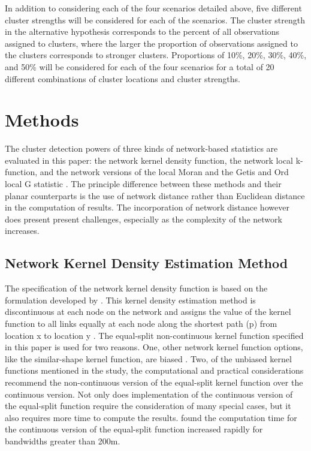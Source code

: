 \documentclass[12pt, letterpaper]{article}
\begin{document}
In addition to considering each of the four scenarios detailed above, five different cluster strengths will be considered for each of the scenarios. The cluster strength in the alternative hypothesis corresponds to the percent of all observations assigned to clusters, where the larger the proportion of observations assigned to the clusters corresponds to stronger clusters. Proportions of 10\%, 20\%, 30\%, 40\%, and 50\% will be considered for each of the four scenarios for a total of 20 different combinations of cluster locations and cluster strengths.

\section{Methods}
The cluster detection powers of three kinds of network-based statistics are evaluated in this paper: the network kernel density function, the network local k-function, and the network versions of the local Moran \citep{anselin1995local} and the Getis and Ord local G statistic \citep{getisord1992distance}. The principle difference between these methods and their planar counterparts is the use of network distance rather than Euclidean distance in the computation of results. The incorporation of network distance however does present present challenges, especially as the complexity of the network increases. 

\subsection{Network Kernel Density Estimation Method}
The specification of the network kernel density function is based on the formulation developed by  \citep{okabe2009kernel}. This kernel density estimation method is discontinuous at each node on the network and assigns the value of the kernel function to all links equally at each node along the shortest path (p) from location x to location y \citep{okabe2009kernel}. The equal-split non-continuous kernel function specified in this paper is used for two reasons. One, other network kernel function options, like the similar-shape kernel function, are biased \citep{okabe2009kernel}. Two, of the unbiased kernel functions mentioned in the study, the computational and practical considerations recommend the non-continuous version of the equal-split kernel function over the continuous version. Not only does implementation of the continuous version of the equal-split function require the consideration of many special cases, but it also requires more time to compute the results. \citet{okabe2009kernel} found the computation time for the continuous version of the equal-split function increased rapidly for bandwidths greater than 200m.     
\end{document}
